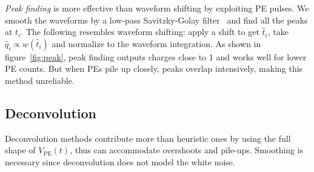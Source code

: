 \textit{Peak finding} is more effective than waveform shifting by exploiting PE pulses.  We smooth the waveforms by a low-pass Savitzky-Golay filter~\cite{savitzky_smoothing_1964} and find all the peaks at $t_i$.  The following resembles waveform shifting: apply a shift to get $\hat{t}_i$, take $\hat{q}_i \propto w(\hat{t}_i)$ and normalize to the waveform integration. As shown in figure~\ref{fig:peak}, peak finding outputs charges close to 1 and works well for lower PE counts.  But when PEs pile up closely, peaks overlap intensively, making this method unreliable.

\subsection{Deconvolution}
\label{sec:deconv}
Deconvolution methods contribute more than heuristic ones by using the full shape of $V_\mathrm{PE}(t)$, thus can accommodate overshoots and pile-ups.  Smoothing is necessary since deconvolution does not model the white noise.

